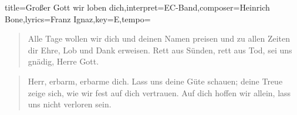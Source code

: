 \documentclass{leadsheet-modern}
\begin{document}
\begin{song}{title={Großer Gott wir loben dich},interpret={EC-Band},composer={Heinrich Bone},lyrics={Franz Ignaz},key={E},tempo={}}
\begin{verse}
Alle Tage wollen wir dich und deinen Namen preisen
und zu allen Zeiten dir Ehre, Lob und Dank erweisen.
Rett aus Sünden, rett aus Tod, sei uns gnädig, Herre Gott.
\end{verse}

\begin{verse}
Herr, erbarm, erbarme dich. Lass uns deine Güte schauen;
deine Treue zeige sich, wie wir fest auf dich vertrauen.
Auf dich hoffen wir allein, lass uns nicht verloren sein.
\end{verse}

\end{song}
\end{document}

